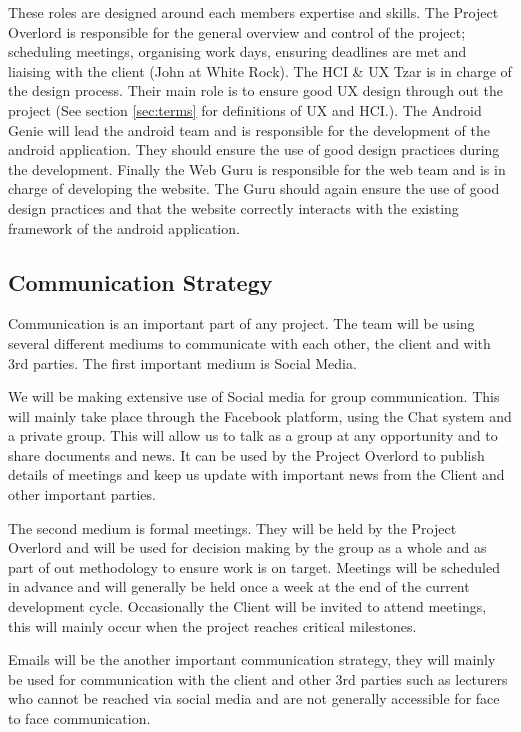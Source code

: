 \documentclass[11pt,a4paper]{article}
\begin{document}
These roles are designed around each members expertise and skills. The Project Overlord is responsible for the general overview and control of the project; scheduling meetings, organising work days, ensuring deadlines are met and liaising with the client (John at White Rock). The HCI \& UX Tzar is in charge of the design process. Their main role is to ensure good UX design through out the project (See section \ref{sec:terms} for definitions of UX and HCI.). The Android Genie will lead the android team and is responsible for the development of the android application. They should ensure the use of good design practices during the development. Finally the Web Guru is responsible for the web team and is in charge of developing the website. The Guru should again ensure the use of good design practices and that the website correctly interacts with the existing framework of the android application. 

\subsection{Communication Strategy}

Communication is an important part of any project. The team will be using several different mediums to communicate with each other, the client and with 3rd parties. The first important medium is Social Media. 

We will be making extensive use of Social media for group communication. This will mainly take place through the Facebook platform, using the Chat system and a private group. This will allow us to talk as a group at any opportunity and to share documents and news. It can be used by the Project Overlord to publish details of meetings and keep us update with important news from the Client and other important parties. 

The second medium is formal meetings. They will be held by the Project Overlord and will be used for decision making by the group as a whole and as part of out methodology to ensure work is on target. Meetings will be scheduled in advance and will generally be held once a week at the end of the current development cycle. Occasionally the Client will be invited to attend meetings, this will mainly occur when the project reaches critical milestones. 

Emails will be the another important communication strategy, they will mainly be used for communication with the client and other 3rd parties such as lecturers who cannot be reached via social media and are not generally accessible for face to face communication. 
\end{document}
